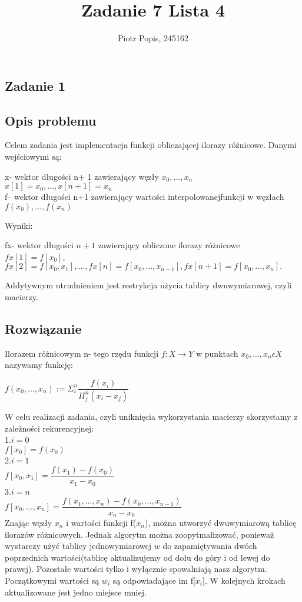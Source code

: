 \documentclass[11pt]{article}
\begin{document}
\title{Zadanie 7 Lista 4}
\author{Piotr Popis, 245162}
\maketitle
\centering

\begin{flushleft}
\section{Zadanie 1}
\subsection{Opis problemu}
Celem zadania jest implementacja funkcji obliczającej ilorazy różnicowe. Danymi wejściowymi są:
\begin{center}
x- wektor długości n+ 1 zawierający węzły $x_0, . . . , x_n$  $x[1]=x_0,...,x[n+1]=x_n$\\
f– wektor długości n+1 zawierający wartości interpolowanejfunkcji w węzłach $f(x_0), . . . , f(x_n)$\\
\begin{flushleft}
Wyniki:
\end{flushleft}
fx- wektor długości $n+1$ zawierający obliczone ilorazy różnicowe\\ $fx[1]=f[x_0]$,\\$fx[2]=f[x_0, x_1],...,fx[n]=f[x_0, . . . , x_{n−1}],fx[n+1]=f[x_0, . . . , x_n].$
\begin{flushleft}
Addytywnym utrudnieniem jest restrykcja użycia tablicy dwuwymiarowej, czyli macierzy.
\end{flushleft}
\end{center}
\subsection{Rozwiązanie}
Ilorazem różnicowym n- tego rzędu funkcji $f:X\longrightarrow Y$ w punktach $x_0, ..., x_n \epsilon X$ nazywamy funkcję:\\
\begin{center}
$f(x_0,...,x_n) := \Sigma^n_i\dfrac{f(x_i)}{\Pi^n_j(x_i-x_j)}$
\end{center}
W celu realizacji zadania, czyli uniknięcia wykorzystania macierzy skorzystamy z zależności rekurencyjnej:\\
1.$i=0$\\
\quad$f[x_0]=f(x_0)$\\
2.$i=1$\\
\quad$f[x_0,x_1]=\dfrac{f(x_1)-f(x_0)}{x_1-x_0}$\\
3.$i=n$\\
\quad$f[x_0,...,x_n]=
\dfrac{f(x_1,...,x_n)-f(x_0,...,x_{n-1})}{x_n-x_0}$\\
Znając węzły $x_n$ i wartości funkcji f($x_n$), można utworzyć dwuwymiarową tablicę ilorazów różnicowych. Jednak algorytm można zoopytmalizować, ponieważ wystarczy użyć tablicy jednowymiarowej $w$ do zapamiętywania dwóch poprzednich wartości(tablicę aktualizujemy od dołu do góry i od lewej do prawej). Pozostałe wartości tylko i wyłącznie spowalniają nasz algorytm. Początkowymi wartości są $w_i$ są odpowiadające im f[$x_i$]. W kolejnych krokach aktualizowane jest jedno miejsce mniej.
\newpage

\end{flushleft}
\end{document}
